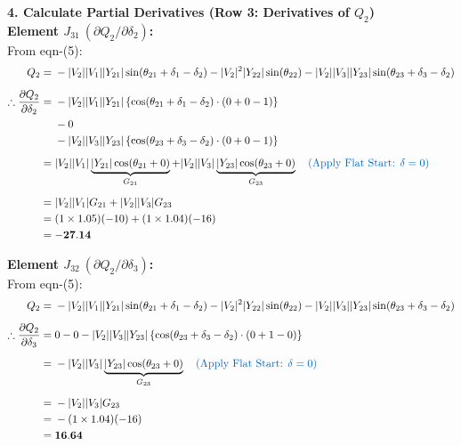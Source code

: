 \documentclass[11pt]{article}
\begin{document}
\begin{stepbox}
\vspace{0.3cm}
\vspace{0.5cm}
\textbf{4. Calculate Partial Derivatives (Row 3: Derivatives of $Q_2$)}\\
%
\noindent \textbf{Element $J_{31} \ (\partial Q_2 / \partial \delta_2)$:} \\
From eqn-(5):
\begin{align*}
    Q_2 =\;& -|V_2||V_1||Y_{21}| \sin(\theta_{21} + \delta_1 - \delta_2) - |V_2|^2|Y_{22}| \sin(\theta_{22}) - |V_2||V_3||Y_{23}| \sin(\theta_{23} + \delta_3 - \delta_2) \\[0.2cm]
    \therefore \frac{\partial Q_2}{\partial \delta_2} =\;& -|V_2||V_1||Y_{21}| \left\{\cos(\theta_{21} + \delta_1 - \delta_2) \cdot (0 + 0 - 1)\right\} \\
    & - 0 \\
    & - |V_2||V_3||Y_{23}| \left\{\cos(\theta_{23} + \delta_3 - \delta_2) \cdot (0 + 0 - 1)\right\} \\[0.2cm]
    =\;& |V_2||V_1|\underbrace{|Y_{21}|\cos(\theta_{21} + 0)}_{G_{21}} + |V_2||V_3|\underbrace{|Y_{23}|\cos(\theta_{23} + 0)}_{G_{23}} \quad \text{\textcolor{mainblue}{(Apply Flat Start: $\delta=0$)}} \\[0.2cm]
    =\;& |V_2||V_1|G_{21} + |V_2||V_3|G_{23} \\
    =\;& (1 \times 1.05)(-10) + (1 \times 1.04)(-16) \\
    =\;& \mathbf{-27.14}
\end{align*}

\vspace{0.3cm}
\noindent \textbf{Element $J_{32} \ (\partial Q_2 / \partial \delta_3)$:} \\
From eqn-(5):
\begin{align*}
    Q_2 =\;& -|V_2||V_1||Y_{21}| \sin(\theta_{21} + \delta_1 - \delta_2) - |V_2|^2|Y_{22}| \sin(\theta_{22}) - |V_2||V_3||Y_{23}| \sin(\theta_{23} + \delta_3 - \delta_2) \\[0.2cm]
    \therefore \frac{\partial Q_2}{\partial \delta_3} =\;& 0 - 0 - |V_2||V_3||Y_{23}| \left\{\cos(\theta_{23} + \delta_3 - \delta_2) \cdot (0 + 1 - 0)\right\} \\[0.2cm]
    =\;& -|V_2||V_3|\underbrace{|Y_{23}|\cos(\theta_{23} + 0)}_{G_{23}} \quad \text{\textcolor{mainblue}{(Apply Flat Start: $\delta=0$)}} \\[0.2cm]
    =\;& -|V_2||V_3|G_{23} \\
    =\;& -(1 \times 1.04)(-16) \\
    =\;& \mathbf{16.64}
\end{align*}


\end{stepbox}
\end{document}
